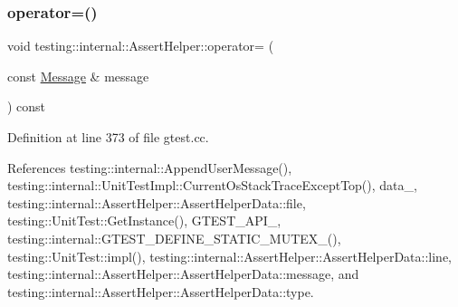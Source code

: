 \subsubsection{\texorpdfstring{operator=()}{operator=()}}
{\footnotesize\ttfamily void testing\+::internal\+::\+Assert\+Helper\+::operator= (\begin{DoxyParamCaption}\item[{const \hyperlink{classtesting_1_1Message}{Message} \&}]{message }\end{DoxyParamCaption}) const}



Definition at line 373 of file gtest.\+cc.



References testing\+::internal\+::\+Append\+User\+Message(), testing\+::internal\+::\+Unit\+Test\+Impl\+::\+Current\+Os\+Stack\+Trace\+Except\+Top(), data\+\_\+, testing\+::internal\+::\+Assert\+Helper\+::\+Assert\+Helper\+Data\+::file, testing\+::\+Unit\+Test\+::\+Get\+Instance(), G\+T\+E\+S\+T\+\_\+\+A\+P\+I\+\_\+, testing\+::internal\+::\+G\+T\+E\+S\+T\+\_\+\+D\+E\+F\+I\+N\+E\+\_\+\+S\+T\+A\+T\+I\+C\+\_\+\+M\+U\+T\+E\+X\+\_\+(), testing\+::\+Unit\+Test\+::impl(), testing\+::internal\+::\+Assert\+Helper\+::\+Assert\+Helper\+Data\+::line, testing\+::internal\+::\+Assert\+Helper\+::\+Assert\+Helper\+Data\+::message, and testing\+::internal\+::\+Assert\+Helper\+::\+Assert\+Helper\+Data\+::type.


